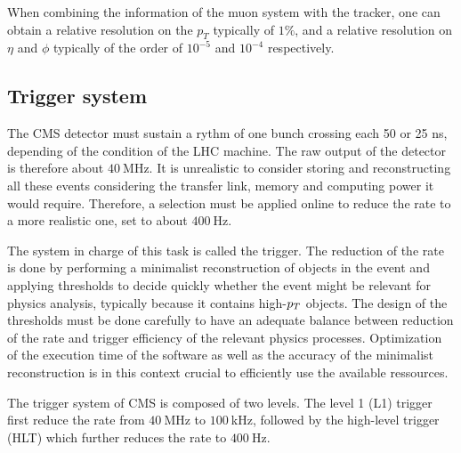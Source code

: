         When combining the information of the muon system with the tracker, one can
        obtain a relative resolution on the $p_T$ typically of $1\%$, and a relative
        resolution on $\eta$ and $\phi$ typically of the order of $10^{-5}$ and $10^{-4}$
        respectively.

        \subsection{Trigger system}


        The CMS detector must sustain a rythm of one bunch crossing each 50 or 25 ns, depending
        of the condition of the LHC machine. The raw output of the detector is therefore
        about $40~$MHz. It is unrealistic to consider storing and reconstructing all these events
        considering the transfer link, memory and computing power it would require.
        Therefore, a selection must be applied online to reduce the rate to a more realistic
        one, set to about $400~$Hz.

        The system in charge of this task is called the trigger. The reduction of the rate
        is done by performing a minimalist reconstruction of objects in the event
        and applying thresholds to decide quickly whether the event might be relevant for
        physics analysis, typically because it contains high-$p_T$ objects. The design of
        the thresholds must be done carefully to have an adequate balance between reduction
        of the rate and trigger efficiency of the relevant physics processes. Optimization
        of the execution time of the software as well as the accuracy of the minimalist
        reconstruction is in this context crucial to efficiently use the available ressources.

        The trigger system of CMS is composed of two levels. The level 1 (L1) trigger first
        reduce the rate from $40~$MHz to $100~$kHz, followed by the high-level trigger (HLT)
        which further reduces the rate to $400~$Hz.


